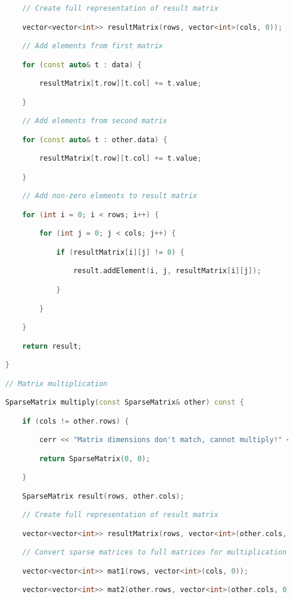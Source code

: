 \begin{lstlisting}[language=C++]
        // Create full representation of result matrix

        vector<vector<int>> resultMatrix(rows, vector<int>(cols, 0));

        // Add elements from first matrix

        for (const auto& t : data) {

            resultMatrix[t.row][t.col] += t.value;

        }

        // Add elements from second matrix

        for (const auto& t : other.data) {

            resultMatrix[t.row][t.col] += t.value;

        }

        // Add non-zero elements to result matrix

        for (int i = 0; i < rows; i++) {

            for (int j = 0; j < cols; j++) {

                if (resultMatrix[i][j] != 0) {

                    result.addElement(i, j, resultMatrix[i][j]);

                }

            }

        }

        return result;

    }

    // Matrix multiplication

    SparseMatrix multiply(const SparseMatrix& other) const {

        if (cols != other.rows) {

            cerr << "Matrix dimensions don't match, cannot multiply!" << endl;

            return SparseMatrix(0, 0);

        }

        SparseMatrix result(rows, other.cols);

        // Create full representation of result matrix

        vector<vector<int>> resultMatrix(rows, vector<int>(other.cols, 0));

        // Convert sparse matrices to full matrices for multiplication

        vector<vector<int>> mat1(rows, vector<int>(cols, 0));

        vector<vector<int>> mat2(other.rows, vector<int>(other.cols, 0));


\end{lstlisting}
